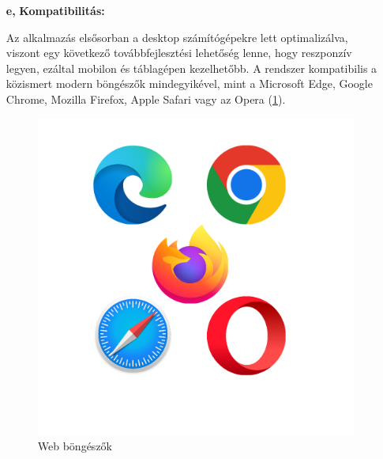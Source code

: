 \begin{itemize}
	\pagebreak
	\item[\textbf{e,}] \textbf{Kompatibilitás:}

Az alkalmazás elsősorban a desktop számítógépekre lett optimalizálva, viszont egy következő továbbfejlesztési lehetőség lenne, hogy reszponzív legyen, ezáltal mobilon és táblagépen kezelhetőbb. A rendszer kompatibilis a közismert modern böngészők mindegyikével, mint a Microsoft Edge, Google Chrome, Mozilla Firefox, Apple Safari vagy az Opera (\ref{abra:browserLogos}).

\begin{figure}[!h]
	\centering
	\includegraphics[scale=0.2]{images/browserLogos}
	\caption{Web böngészők}
	\label{abra:browserLogos}
\end{figure}
\end{itemize}